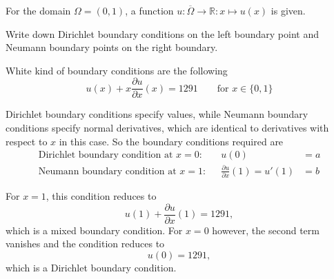 For the domain $\Omega = (0,1)$, a function
$u\colon\overline{\Omega}\to\mathbb{R}:x\mapsto u(x)$ is given.
\begin{teilaufgaben}
\item
Write down Dirichlet boundary conditions on the left
boundary point and Neumann boundary points on the right boundary.
\item
White kind of boundary conditions are the following
\[
u(x)
+
x\frac{\partial u}{\partial x}(x)
=
1291
\qquad
\text{for $x\in \{0,1\}$}
\]
\end{teilaufgaben}

\begin{loesung}
\begin{teilaufgaben}
\item
Dirichlet boundary conditions specify values, while Neumann
boundary conditions specify normal derivatives, which are identical to
derivatives with respect to $x$ in this case.
So the boundary conditions required are
\begin{align*}
\text{Dirichlet boundary condition at $x=0$:}&
&
u(0)&= a
\\
\text{Neumann boundary condition at $x=1$:}&
&
\frac{\partial u}{\partial x}(1)=u'(1)&= b
\end{align*}
\item
For $x=1$, this condition reduces to
\[
u(1) + \frac{\partial u}{\partial x}(1)=1291,
\]
which is a mixed boundary condition.
For $x=0$ however, the second term vanishes and the condition reduces to
\[
u(0) = 1291,
\]
which is a Dirichlet boundary condition.
\qedhere
\end{teilaufgaben}
\end{loesung}


